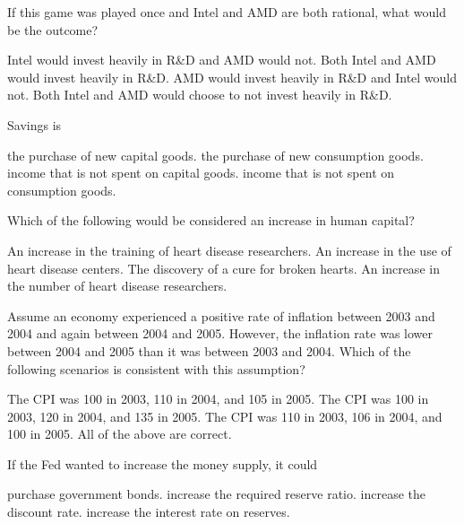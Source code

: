 \documentclass[addpoints,11pt]{exam}
\theoremstyle{definition}
\begin{document}
\begin{questions}
	If this game was played once and Intel and AMD are both rational, what would be the outcome?
	
	\begin{choices}
			\CorrectChoice Intel would invest heavily in R\&D and AMD would not.
			\choice Both Intel and AMD would invest heavily in R\&D.
			\choice AMD would invest heavily in R\&D and Intel would not.
			\choice Both Intel and AMD would choose to not invest heavily in R\&D.
	\end{choices}

	
	\question Savings is 
	

	
	\begin{choices}
		\choice the purchase of new capital goods.
		\choice the purchase of new consumption goods.
		\choice income that is not spent on capital goods.
		\CorrectChoice income that is not spent on consumption goods. 
	\end{choices}	
	

	
	\question Which of the following would be considered an increase in human capital?
	
		\begin{choices}
			\CorrectChoice An increase in the training of heart disease researchers.
			\choice An increase in the use of heart disease centers.
			\choice The discovery of a cure for broken hearts.
			\choice An increase in the number of heart disease researchers.
		\end{choices}
		

		
	\question Assume an economy experienced a positive rate of inflation between 2003 and 2004 and again between 2004 and 2005. However, the inflation rate was lower between 2004 and 2005 than it was between 2003 and 2004. Which of the following scenarios is consistent with this assumption?


	
	\begin{choices}
		\choice The CPI was 100 in 2003, 110 in 2004, and 105 in 2005.
		\CorrectChoice The CPI was 100 in 2003, 120 in 2004, and 135 in 2005.
		\choice The CPI was 110 in 2003, 106 in 2004, and 100 in 2005.
		\choice All of the above are correct.
	\end{choices}
	
	
	\question  If the Fed wanted to increase the money supply, it could
	
		
		\begin{choices}
			\CorrectChoice purchase government bonds.
			\choice increase the required reserve ratio.
			\choice increase the discount rate.
			\choice increase the interest rate on reserves.
		\end{choices}
	

\end{questions}
\end{document}
